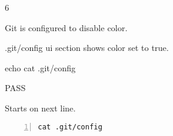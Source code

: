 \begin{description}[align=right,leftmargin=3.2cm,labelindent=3.0cm]
\item[Step:] 6
\item[Confirm:] Git is configured to disable color.
\item[Expectation:] .git/config ui section shows color set to true.
\item[Command:] echo cat  .git/config
\item[Test Result:] PASS
\item[Evidence:] Starts on next line.
\end{description}
\begin{lstlisting}[numbers=left]
cat .git/config

\end{lstlisting}

